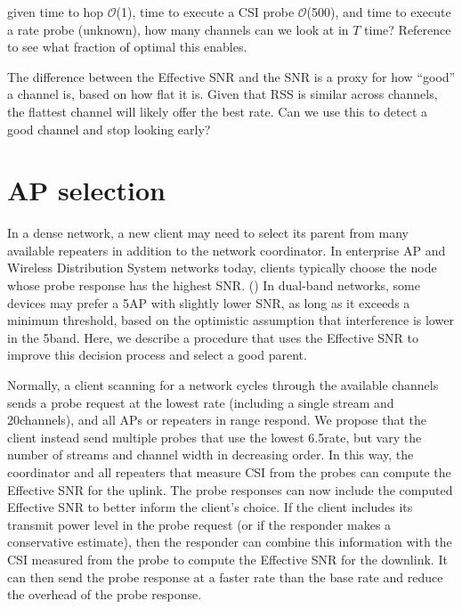   given time to hop $\mathcal{O}$(1\ms), time to execute a CSI probe $\mathcal{O}$(500\us), and time to execute a rate probe (unknown), how many channels can we look at in $T$ time? Reference  to see what fraction of optimal this enables.

 The difference between the Effective SNR and the SNR is a proxy for how ``good'' a channel is, based on how flat it is. Given that RSS is similar across channels, the flattest channel will likely offer the best rate. Can we use this to detect a good channel and stop looking early?

\section{AP selection}\label{sec:esnr_apsel}
In a dense network, a new client may need to select its parent from many available repeaters in addition to the network coordinator. In enterprise AP and Wireless Distribution System networks today, clients typically choose the node whose probe response has the highest SNR\@. () In dual-band networks, some devices may prefer a 5\GHz AP with slightly lower SNR, as long as it exceeds a minimum threshold, based on the optimistic assumption that interference is lower in the 5\GHz band. Here, we describe a procedure that uses the Effective SNR to improve this decision process and select a good parent.

Normally, a client scanning for a network cycles through the available channels sends a probe request at the lowest rate (including a single stream and 20\MHz channels), and all APs or repeaters in range respond. We propose that the client instead send multiple probes that use the lowest 6.5\Mbps rate, but vary the number of streams and channel width in decreasing order. In this way, the coordinator and all repeaters that measure CSI from the probes can compute the Effective SNR for the uplink. The probe responses can now include the computed Effective SNR to better inform the client's choice. If the client includes its transmit power level in the probe request (or if the responder makes a conservative estimate), then the responder can combine this information with the CSI measured from the probe to compute the Effective SNR for the downlink. It can then send the probe response at a faster rate than the base rate and reduce the overhead of the probe response.

